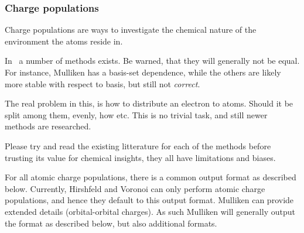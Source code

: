 
\subsubsection{Charge populations}
\label{sec:charge-populations}

Charge populations are ways to investigate the chemical nature of the
environment the atoms reside in.

In \siesta\ a number of methods exists. Be warned, that they will generally
not be equal. For instance, Mulliken has a basis-set dependence, while the others are
likely more stable with respect to basis, but still not \emph{correct}.

The real problem in this, is how to distribute an electron to atoms.
Should it be split among them, evenly, how etc. This is no trivial task, and still
newer methods are researched.

Please try and read the existing litterature for each of the methods before trusting
its value for chemical insights, they all have limitations and biases.

For all atomic charge populations, there is a common output format as described below.
Currently, Hirshfeld and Voronoi can only perform atomic charge populations, and
hence they default to this output format.
%
Mulliken can provide extended details (orbital-orbital charges).
As such Mulliken will generally output
the format as described below, but also additional formats.

